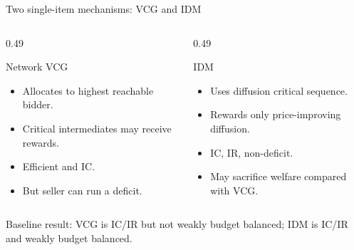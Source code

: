 \documentclass[10pt,aspectratio=169]{beamer}
\begin{document}
\begin{frame}{Two single-item mechanisms: VCG and IDM}



\begin{columns}[T,totalwidth=\textwidth]
\begin{column}{0.49\textwidth}
\begin{block}{Network VCG}
\begin{itemize}
    \item Allocates to highest reachable bidder.
    \item Critical intermediates may receive rewards.
    \item Efficient and IC.
    \item But seller can run a deficit.
\end{itemize}
\end{block}
\end{column}
\begin{column}{0.49\textwidth}
\begin{block}{IDM}
\begin{itemize}
    \item Uses diffusion critical sequence.
    \item Rewards only price-improving diffusion.
    \item IC, IR, non-deficit.
    \item May sacrifice welfare compared with VCG.
\end{itemize}
\end{block}
\end{column}
\end{columns}
\vspace{2mm}
\begin{center}
\end{center}
{\tiny Baseline result: VCG is IC/IR but not weakly budget balanced; IDM is IC/IR and weakly budget balanced.}
\end{frame}
\end{document}
